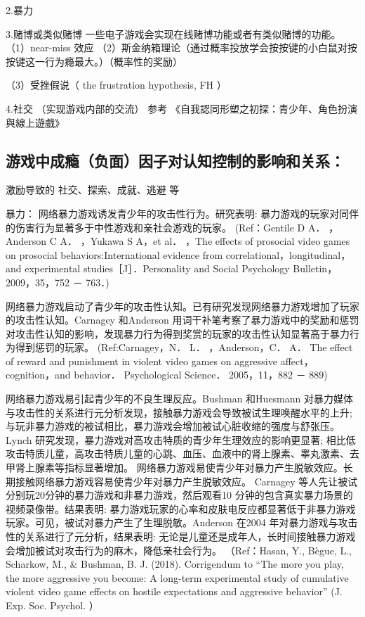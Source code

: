 2.暴力


3.赌博或类似赌博
一些电子游戏会实现在线赌博功能或者有类似赌博的功能。
（1）near-miss 效应
（2）斯金纳箱理论（通过概率投放学会按按键的小白鼠对按按键这一行为瘾最大。）（概率性的奖励）


（3）受挫假说（ the frustration hypothesis, FH ）


4.社交 （实现游戏内部的交流）
参考 《自我認同形塑之初探：青少年、角色扮演與線上遊戲》

\subsection{游戏中成瘾（负面）因子对认知控制的影响和关系：}
  激励导致的
  社交、探索、成就、逃避 等

  暴力：
网络暴力游戏诱发青少年的攻击性行为。研究表明: 暴力游戏的玩家对同伴的伤害行为显著多于中性游戏和亲社会游戏的玩家。
   (Ref：Gentile D A． ，Anderson C A． ，Yukawa S A，et al． ，The effects of prosocial video games on prosocial behaviors:International evidence from correlational，longitudinal，and experimental studies［J］．Personality and Social Psychology Bulletin，2009，35，752 － 763．)

 网络暴力游戏启动了青少年的攻击性认知。已有研究发现网络暴力游戏增加了玩家的攻击性认知。Carnagey 和Anderson 用词干补笔考察了暴力游戏中的奖励和惩罚对攻击性认知的影响，发现暴力行为得到奖赏的玩家的攻击性认知显著高于暴力行为得到惩罚的玩家。
  (Ref:Carnagey，N． L． ，Anderson，C． A． The effect of reward and punishment in violent video games on aggressive affect，cognition，and behavior． Psychological Science． 2005，11，882 － 889)

 网络暴力游戏易引起青少年的不良生理反应。Bushman 和Huesmann 对暴力媒体与攻击性的关系进行元分析发现，接触暴力游戏会导致被试生理唤醒水平的上升; 与玩非暴力游戏的被试相比，暴力游戏会增加被试心脏收缩的强度与舒张压。Lynch 研究发现，暴力游戏对高攻击特质的青少年生理效应的影响更显著; 相比低攻击特质儿童，高攻击特质儿童的心跳、血压、血液中的肾上腺素、睾丸激素、去甲肾上腺素等指标显著增加。
 网络暴力游戏易使青少年对暴力产生脱敏效应。长期接触网络暴力游戏容易使青少年对暴力产生脱敏效应。 Carnagey 等人先让被试分别玩20分钟的暴力游戏和非暴力游戏，然后观看10 分钟的包含真实暴力场景的视频录像带。结果表明: 暴力游戏玩家的心率和皮肤电反应都显著低于非暴力游戏玩家。可见，被试对暴力产生了生理脱敏。Anderson 在2004 年对暴力游戏与攻击性的关系进行了元分析，结果表明: 无论是儿童还是成年人，长时间接触暴力游戏会增加被试对攻击行为的麻木，降低亲社会行为。
（Ref：Hasan, Y., Bègue, L., Scharkow, M., & Bushman, B. J. (2018). Corrigendum to “The more you play, the more aggressive you become: A long-term experimental study of cumulative violent video game effects on hostile expectations and aggressive behavior” (J. Exp. Soc. Psychol. ）

